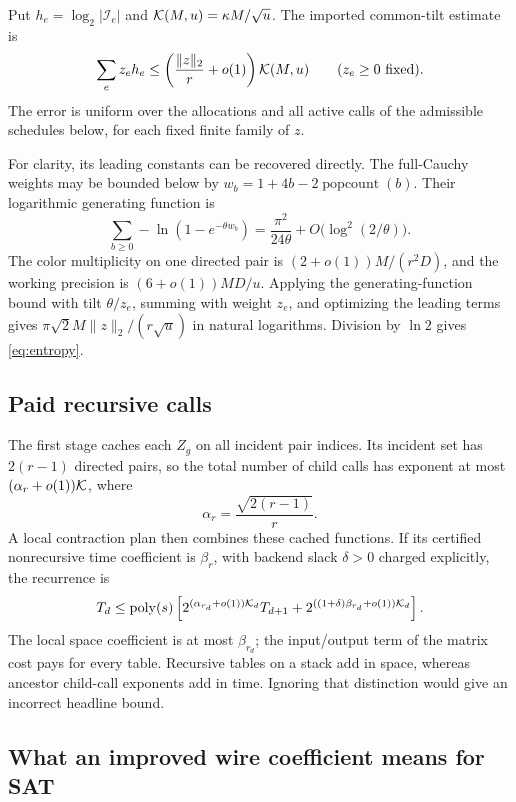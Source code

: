 Put $h_e=\log_2|\mathcal I_e|$ and
$\mathcal K(M,u)=\kappa M/\sqrt u$. The imported common-tilt estimate is
\begin{equation}\label{eq:entropy}
 \sum_e z_e h_e\le
  \left(\frac{\|z\|_2}{r}+o(1)\right)\mathcal K(M,u)
 \qquad (z_e\ge0\hbox{ fixed}).
\end{equation}
The error is uniform over the allocations and all active calls of the
admissible schedules below, for each fixed finite family of $z$.

For clarity, its leading constants can be recovered directly. The
full-Cauchy weights may be bounded below by
$w_b=1+4b-2\operatorname{popcount}(b)$. Their logarithmic generating
function is
\[
 \sum_{b\ge0}-\ln(1-e^{-\theta w_b})
 =\frac{\pi^2}{24\theta}+O\bigl(\log^2(2/\theta)\bigr).
\]
The color multiplicity on one directed pair is
$(2+o(1))M/(r^2D)$, and the working precision is
$(6+o(1))MD/u$. Applying the generating-function bound with tilt
$\theta/z_e$, summing with weight $z_e$, and optimizing the leading terms
gives $\pi\sqrt2 M\|z\|_2/(r\sqrt u)$ in natural logarithms.
Division by $\ln2$ gives \eqref{eq:entropy}.

\subsection{Paid recursive calls}

The first stage caches each $Z_g$ on all incident pair indices. Its
incident set has $2(r-1)$ directed pairs, so the total number of child
calls has exponent at most $(\alpha_r+o(1))\mathcal K$, where
\begin{equation}\label{eq:alpha}
 \alpha_r=\frac{\sqrt{2(r-1)}}r.
\end{equation}
A local contraction plan then combines these cached functions. If its
certified nonrecursive time coefficient is $\beta_r$, with backend slack
$\delta>0$ charged explicitly, the recurrence is
\begin{equation}\label{eq:paid-recurrence}
 T_d\le\operatorname{poly}(s)\left[
     2^{(\alpha_{r_d}+o(1))\mathcal K_d}T_{d+1}
       +2^{((1+\delta)\beta_{r_d}+o(1))\mathcal K_d}\right].
\end{equation}
The local space coefficient is at most $\beta_{r_d}$; the input/output
term of the matrix cost pays for every table. Recursive tables on a stack
add in space, whereas ancestor child-call exponents add in time. Ignoring
that distinction would give an incorrect headline bound.

\subsection{What an improved wire coefficient means for SAT}

